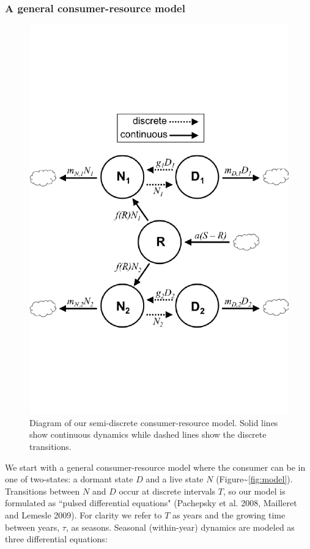 \documentclass[12pt,]{article}
\begin{document}
\subsubsection{A general consumer-resource
model}\label{a-general-consumer-resource-model}

\begin{figure}[htbp]
\centering
\includegraphics{components/figure/manuscript-figure_1.pdf}
\caption{Diagram of our semi-discrete consumer-resource model. Solid
lines show continuous dynamics while dashed lines show the discrete
transitions.}
\end{figure}

We start with a general consumer-resource model where the consumer can
be in one of two-states: a dormant state $D$ and a live state $N$
(Figure\textasciitilde{}\ref{fig:model}). Transitions between $N$ and
$D$ occur at discrete intervals $T$, so our model is formulated as
``pulsed differential equations" (Pachepsky et al. 2008, Mailleret and
Lemesle 2009). For clarity we refer to $T$ as years and the growing time
between years, $\tau$, as seasons. Seasonal (within-year) dynamics are
modeled as three differential equations:
\end{document}
